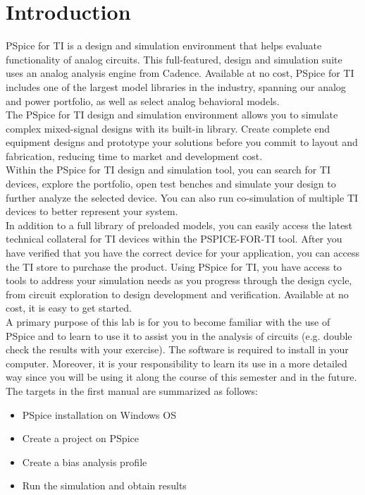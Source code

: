 
\section{Introduction}
PSpice for TI is a design and simulation environment that helps evaluate functionality of analog circuits. This full-featured, design and simulation suite uses an analog analysis engine from Cadence\textregistered{}. Available at no cost, PSpice for TI includes one of the largest model libraries in the industry, spanning our analog and power portfolio, as well as select analog behavioral models.\\

The PSpice for TI design and simulation environment allows you to simulate complex mixed-signal designs with its built-in library. Create complete end equipment designs and prototype your solutions before you commit to layout and fabrication, reducing time to market and development cost. \\

Within the PSpice for TI design and simulation tool, you can search for TI devices, explore the portfolio, open test benches and simulate your design to further analyze the selected device. You can also run co-simulation of multiple TI devices to better represent your system.\\

In addition to a full library of preloaded models, you can easily access the latest technical collateral for TI devices within the PSPICE-FOR-TI tool. After you have verified that you have the correct device for your application, you can access the TI store to purchase the product. Using PSpice for TI, you have access to tools to address your simulation needs as you progress through the design cycle, from circuit exploration to design development and verification. Available at no cost, it is easy to get started.\\

A primary purpose of this lab is for you to become familiar with the use of PSpice and to learn to use it to assist you in the analysis of circuits (e.g. double check the results with your exercise). The software is required to  install in your computer. Moreover, it is your responsibility to learn its use in a more detailed way since you will be using it along the course of this semester and in the future.
The targets in the first manual are summarized as follows:
\begin{itemize}
    \item PSpice installation on Windows OS
    \item Create a project on PSpice
    \item Create a bias analysis profile
    \item Run the simulation and obtain results
\end{itemize}
\newpage
